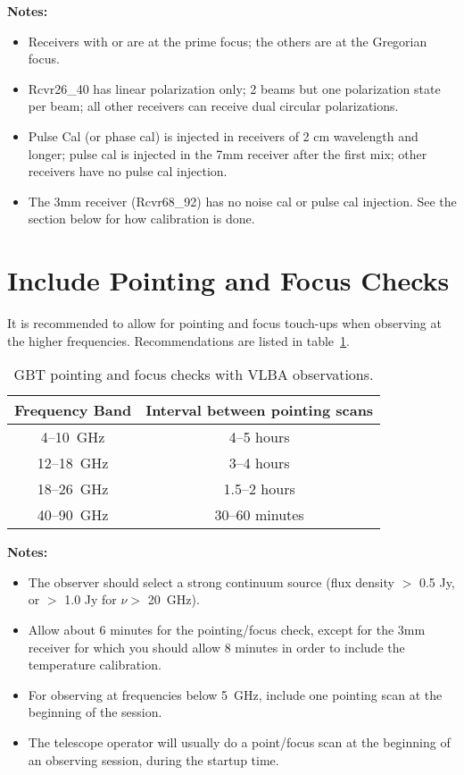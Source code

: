 \noindent\textbf{Notes:}
\begin{itemize}
\item Receivers with  or  are at the prime focus; the others
are at the Gregorian focus.
\item Rcvr26\_40 has linear polarization only; 2 beams but one polarization
state per beam; all other receivers can receive dual circular polarizations.
\item Pulse Cal (or phase cal) is injected in receivers of 2 cm wavelength and
longer; pulse cal is injected in the 7mm receiver after the first mix; other
receivers have no pulse cal injection.
\item The 3mm receiver (Rcvr68\_92) has no noise cal or pulse cal injection.
See the section below for how calibration is done.
\end{itemize}


\newpage

\section{Include Pointing and Focus Checks}

It is recommended to allow for pointing and focus touch-ups when observing at
the higher frequencies. Recommendations are listed in
table~\ref{table:vlbapointing}.

\begin{table}[!h]
\begin{center}
\begin{tabular}{cc}
\toprule
Frequency Band &  Interval between pointing scans \\
\midrule
4--10~GHz & 4--5 hours \\
12--18~GHz & 3--4 hours \\
18--26~GHz & 1.5--2 hours \\
40--90~GHz & 30--60 minutes \\
\bottomrule
\end{tabular}
\caption[GBT pointing and focus checks with VLBA observations]
{GBT pointing and focus checks with VLBA observations.
\label{table:vlbapointing}}
\end{center}
\end{table}

\noindent\textbf{Notes:}
\begin{itemize}
\item The observer should select a strong continuum source (flux density
$>$ 0.5 Jy, or $>$ 1.0 Jy for $\nu >$ 20~GHz).
\item Allow about 6 minutes for the pointing/focus check, except for the 3mm
receiver for which you should allow 8 minutes in order to include the
temperature calibration.
\item For observing at frequencies below 5~GHz, include one pointing scan at
the beginning of the session.
\item The telescope operator will usually do a point/focus scan at the beginning
of an observing session, during the startup time.
\end{itemize}

